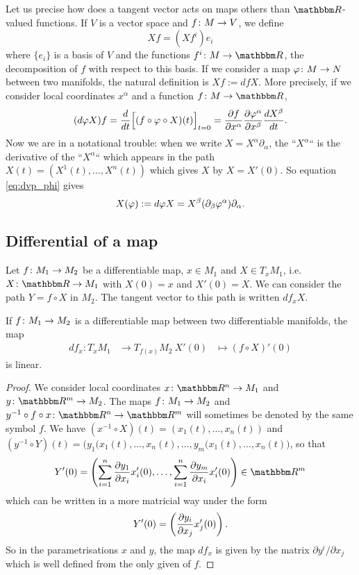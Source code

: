 \label{pg:vecto_vecto}Let us precise how does a tangent vector acts on maps others than $\eR$-valued functions. If $V$ is a vector space and $f\colon M\to V$, we define
\[
   Xf=(Xf^i)e_i
\]
where $\{e_i\}$ is a basis of $V$ and the functions $\dpt{f^i}{M}{\eR}$, the decomposition of $f$ with respect to this basis. If we consider a map $\varphi\colon M\to N$ between two manifolds, the natural definition is $Xf:=dfX$. More precisely, if we consider local coordinates $x^{\alpha}$ and a function $\dpt{f}{M}{\eR}$,
\begin{equation}\label{eq:dvp_phi}
   (d\varphi X)f=\frac{d}{dt}\Big[  (f\circ\varphi\circ X)(t) \Big]_{t=0}=\frac{\partial f}{\partial x^{\alpha}}\frac{\partial \varphi^{\alpha}}{\partial x^{\beta}}\frac{dX^{\beta}}{dt}.
\end{equation}
Now we are in a notational trouble: when we write $X=X^{\alpha}\partial_{\alpha}$, the ``$X^{\alpha}$``{} is the derivative of the ``$X^{\alpha}$``{} which appears in the path $X(t)=(X^1(t),\ldots,X^n(t))$ which gives $X$ by $X=X'(0)$. So equation \eqref{eq:dvp_phi} gives
\begin{equation}
   X(\varphi):=d\varphi X=X^{\beta}(\partial_{\beta}\varphi^{\alpha})\partial_{\alpha}.
\end{equation}

\subsection{Differential of a map}

Let $f\colon M_1\to M_2$ be a differentiable map, $x\in M_1$ and $X\in T_xM_1$, i.e. $\dpt{X}{\eR}{M_1}$ with $X(0)=x$ and $X'(0)=X$. We can consider the path $Y=f\circ X$ in $M_2$. The tangent vector to this path is written $df_x X$.

\begin{proposition}
If $f\colon M_1\to M_2$ is a differentiable map between two differentiable manifolds, the map
		\begin{equation}
		\begin{aligned}
			df_x \colon T_xM_1 &\to T_{f(x)}M_2\
			X'(0)&\mapsto (f\circ X)'(0)
		\end{aligned}
	\end{equation}	
is linear.
\end{proposition}

\begin{proof}
We consider local coordinates $\dpt{x}{\eR^n}{M_1}$ and $\dpt{y}{\eR^m}{M_2}$. The maps $f\colon M_1\to M_2$ and $\dpt{y^{-1}\circ f\circ x}{\eR^n}{\eR^m}$ will sometimes be denoted by the same symbol $f$. We have $(x^{-1}\circ X)(t)=(x_1(t),\ldots,x_n(t))$ and $(y^{-1}\circ Y)(t)=\big( y_1(x_1(t),\ldots,x_n(t),\ldots, y_m(x_1(t),\ldots,x_n(t)  \big)$, so that
\[
  Y'(0)=\left(   \sum_{i=1}^n \dsd{y_1}{x_i}x_i'(0),\ldots,\sum_{i=1}^n \dsd{y_m}{x_i}x_i'(0)   \right)\in\eR^m
\]
which can be written in a more matricial way under the form
\[
   Y'(0)=\left( \frac{\partial y_i}{\partial x_j}x'_j(0) \right).
\]
So in the parametrisations $x$ and $y$, the map $df_x$ is given by the matrix $\partial y^i/\partial x_j$ which is well defined from the only given of $f$.
\end{proof}


